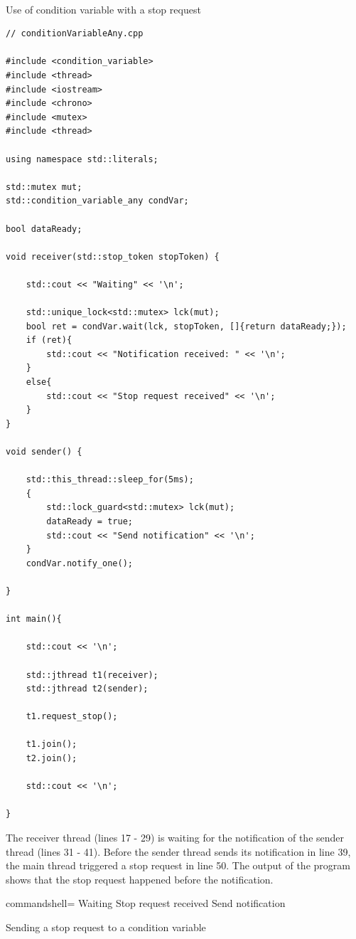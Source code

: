 \hspace*{\fill} \\ %
\noindent
Use of condition variable with a stop request
\begin{lstlisting}[style=styleCXX]
// conditionVariableAny.cpp

#include <condition_variable>
#include <thread>
#include <iostream>
#include <chrono>
#include <mutex>
#include <thread>

using namespace std::literals;

std::mutex mut;
std::condition_variable_any condVar;

bool dataReady;

void receiver(std::stop_token stopToken) {

	std::cout << "Waiting" << '\n';
	
	std::unique_lock<std::mutex> lck(mut);
	bool ret = condVar.wait(lck, stopToken, []{return dataReady;});
	if (ret){
		std::cout << "Notification received: " << '\n';
	}
	else{
		std::cout << "Stop request received" << '\n';
	}
}

void sender() {

	std::this_thread::sleep_for(5ms);
	{
		std::lock_guard<std::mutex> lck(mut);
		dataReady = true;
		std::cout << "Send notification" << '\n';
	}
	condVar.notify_one();

}

int main(){

	std::cout << '\n';
	
	std::jthread t1(receiver);
	std::jthread t2(sender);
	
	t1.request_stop();
	
	t1.join();
	t2.join();
	
	std::cout << '\n';

}
\end{lstlisting}

The receiver thread (lines 17 - 29) is waiting for the notification of the sender thread (lines 31 - 41). Before the sender thread sends its notification in line 39, the main thread triggered a stop request in line 50. The output of the program shows that the stop request happened before the notification.

\begin{tcblisting}{commandshell={}}
Waiting
Stop request received
Send notification
\end{tcblisting}

\begin{center}
Sending a stop request to a condition variable
\end{center}

